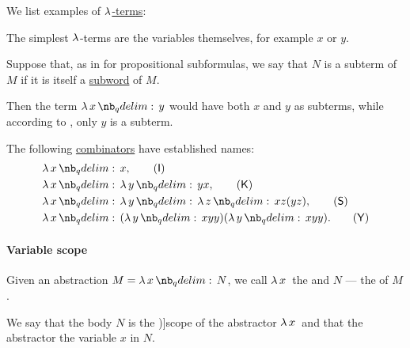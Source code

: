 \begin{example}\label{ex:def:lambda_term}
  We list examples of \hyperref[def:lambda_term]{\( \mathrm{\lambda} \)-terms}:
  \begin{thmenum}
     The simplest \( \mathrm{\lambda} \)-terms are the variables themselves, for example \( x \) or \( y \).

     Suppose that, as in  for propositional subformulas, we say that \( N \) is a subterm of \( M \) if it is itself a \hyperref[def:formal_language/subword]{subword} of \( M \).

    Then the term \( \qabs x y \) would have both \( x \) and \( y \) as subterms, while according to , only \( y \) is a subterm.

     The following \hyperref[def:lambda_term/closed]{combinators} have established names:
    \begin{align}
      &\qabs x x, \label{eq:ex:def:lambda_term/combinator/i}\tag{\logic{I}} \\
      &\qabs x \qabs y yx, \nonumber\label{eq:ex:def:lambda_term/combinator/k}\tag{\logic{K}} \\
      &\qabs x \qabs y \qabs z xz(yz), \label{eq:ex:def:lambda_term/combinator/s}\tag{\logic{S}} \\
      &\qabs x (\qabs y xyy) (\qabs y xyy). \label{eq:ex:def:lambda_term/combinator/y}\tag{\logic{Y}}
    \end{align}
  \end{thmenum}
\end{example}

\paragraph{Variable scope}

\begin{definition}\label{def:lambda_abstractor}
  Given an abstraction \( M = \qabs x N \), we call \( \quantifier* \synlambda x \) the  and \( N \) --- the  of \( M \).

  We say that the body \( N \) is the \term[ru=область действия (\cite[64]{Герасимов2011})]{scope} of the abstractor \( \quantifier* \synlambda x \) and that the abstractor  the variable \( x \) in \( N \).
\end{definition}

